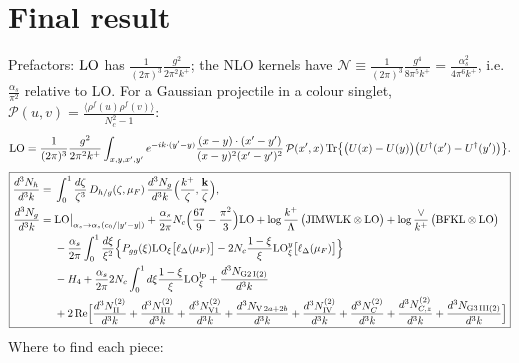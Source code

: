 \documentclass[10pt]{article}
\numberwithin{equation}{section}
\newcommand{\LO}{{\rm LO}}
\newcommand{\PP}{\mathcal P}
\newcommand{\Tr}{{\rm Tr}}
\newcommand{\Ud}{U^\dagger}
\begin{document}

\section{Final result}\label{sec:final}
Prefactors: $\LO$ has $\frac{1}{(2\pi)^3}\frac{g^2}{2\pi^2k^+}$; the NLO kernels have $\mathcal N\equiv\frac{1}{(2\pi)^3}\frac{g^4}{8\pi^5k^+}=\frac{\alpha_s^2}{4\pi^6k^+}$, i.e.\ $\frac{\alpha_s}{\pi^2}$ relative to LO. For a Gaussian projectile in a colour singlet, $\PP(u,v)=\frac{\langle\rho^f(u)\rho^f(v)\rangle}{N_c^2-1}$:
\begin{equation}
\LO=\frac{1}{(2\pi)^3}\frac{g^2}{2\pi^2k^+}\int_{x,y,x',y'}e^{-ik\cdot(y'-y)}\frac{(x-y)\cdot(x'-y')}{(x-y)^2(x'-y')^2}\,\PP(x',x)\,\Tr\big\{\big(U(x)-U(y)\big)\big(\Ud(x')-\Ud(y')\big)\big\}.
\end{equation}
\begin{equation}
\boxed{\begin{aligned}
\frac{d^3N_h}{d^3k}={}&\int_0^1\frac{d\zeta}{\zeta^3}\,D_{h/g}(\zeta,\mu_F)\,\frac{d^3N_g}{d^3k}\Big(\frac{k^+}{\zeta},\frac{\mathbf k}{\zeta}\Big),\\
\frac{d^3N_g}{d^3k}={}&\LO\big|_{\alpha_s\to\alpha_s(c_0/|y'-y|)}+\frac{\alpha_s}{2\pi}N_c\Big(\frac{67}{9}-\frac{\pi^2}{3}\Big)\LO+\log\frac{k^+}{\Lambda}\,\big(\text{JIMWLK}\otimes\LO\big)+\log\frac{\vee}{k^+}\,\big(\text{BFKL}\otimes\LO\big)\\
&-\frac{\alpha_s}{2\pi}\int_0^1\frac{d\xi}{\xi^2}\Big\{P_{gg}(\xi)\LO_\xi\big[\ell_\Delta(\mu_F)\big]-2N_c\frac{1-\xi}{\xi}\LO^y_\xi\big[\ell_\Delta(\mu_F)\big]\Big\}\\
&-H_4+\frac{\alpha_s}{2\pi}2N_c\int_0^1d\xi\frac{1-\xi}{\xi}\LO^{\rm lp}_\xi+\frac{d^3N_{\rm G2\,I(2)}}{d^3k}\\
&+2\,{\rm Re}\Big[\frac{d^3N^{(2)}_{\rm II}}{d^3k}+\frac{d^3N^{(2)}_{\rm III}}{d^3k}+\frac{d^3N^{(2)}_{\rm V1}}{d^3k}+\frac{d^3N_{{\rm V}\,2a+2b}}{d^3k}+\frac{d^3N^{(2)}_{\rm IV}}{d^3k}+\frac{d^3N^{(2)}_{C}}{d^3k}+\frac{d^3N^{(2)}_{C,z}}{d^3k}+\frac{d^3N_{\rm G3\,III(2)}}{d^3k}\Big]
\end{aligned}}\label{eq:final}
\end{equation}
Where to find each piece:
\end{document}
